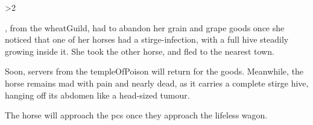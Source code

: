 \ifnum\value{temperature}>2


\begin{exampletext}
  \composeHumanName,  from the \gls{wheatGuild}, had to abandon her grain and grape goods once she noticed that one of her horses had a stirge-infection, with a full hive steadily growing inside it.
  She took the other horse, and fled to the nearest town.
\end{exampletext}

Soon, \glspl{server} from the \gls{templeOfPoison} will return for the goods.
Meanwhile, the horse remains mad with pain and nearly dead, as it carries a complete stirge hive, hanging off its abdomen like a head-sized tumour.

\stirgeSwarm

The horse will approach the \glspl{pc} once they approach the lifeless wagon.

\fi
